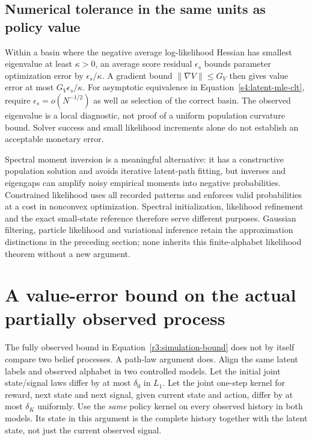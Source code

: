 \subsection{Numerical tolerance in the same units as policy value}
Within a basin where the negative average log-likelihood Hessian has
smallest eigenvalue at least $\kappa>0$, an average score residual
$\epsilon_s$ bounds parameter optimization error by
$\epsilon_s/\kappa$. A gradient bound $\|\nabla V\|\le G_V$ then
gives value error at most $G_V\epsilon_s/\kappa$. For asymptotic equivalence
in Equation~\eqref{s4:latent-mle-clt}, require
$\epsilon_s=o(N^{-1/2})$ as well as selection of the correct basin.
The observed eigenvalue is a local diagnostic, not proof of a uniform
population curvature bound. Solver success and small likelihood increments
alone do not establish an acceptable monetary error.

Spectral moment inversion is a meaningful alternative: it has a constructive
population solution and avoids iterative latent-path fitting, but inverses
and eigengaps can amplify noisy empirical moments into negative probabilities.
Constrained likelihood uses all recorded patterns and enforces valid
probabilities at a cost in nonconvex optimization. Spectral initialization,
likelihood refinement and the exact small-state reference therefore serve
different purposes. Gaussian filtering, particle likelihood and variational
inference retain the approximation distinctions in the preceding section;
none inherits this finite-alphabet likelihood theorem without a new argument.

\section{A value-error bound on the actual partially observed process}
\label{s4:pomdp-error}
The fully observed bound in Equation~\eqref{r3:simulation-bound} does not
by itself compare two belief processes. A path-law argument does. Align
the same latent labels and observed alphabet in two controlled models.
Let the initial joint state/signal laws differ by at most $\delta_0$ in
$L_1$. Let the joint one-step kernel for reward, next state and next signal,
given current state and action, differ by at most $\delta_K$ uniformly.
Use the \emph{same} policy kernel on every observed history in both models.
Its state in this argument is the complete history together with the latent
state, not just the current observed signal.

